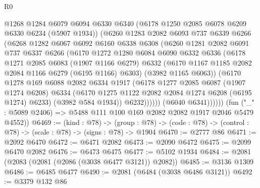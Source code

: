 \begin{lexlean}{R0}
\begin{coremodule}
                  @1268
                  @1284
                  @6079
                  @6094
                  @6330
                  @6340
                  (@6178 @1250 @2085 @6078 @6209 @6330 @6234 (@5907 @1934))
                  (@6260
                    @1283
                    @2082
                    @6093
                    @737
                    @6339
                    @6266
                    (@6268
                      @1282
                      @6067
                      @6092
                      @6160
                      @6338
                      @6308
                      (@6260
                        @1281
                        @2082
                        @6091
                        @737
                        @6337
                        @6266
                        (@6170
                          @1272
                          @1280
                          @6084
                          @6090
                          @6332
                          @6336
                          (@6178
                            @1271
                            @2085
                            @6083
                            (@1907 @1166 @6279)
                            @6332
                            (@6170 @1167 @1185 @2082 @2084 @1166 @6279 (@6195 @1166) @6303)
                            (@3982 @1165 @6063))
                          (@6170
                            @1278
                            @169
                            @6088
                            @2082
                            @6334
                            @1917
                            (@6178
                              @1277
                              @2085
                              @6087
                              (@1907 @1274 @6208)
                              @6334
                              (@6170 @1275 @1122 @2082 @2084 @1274 @6208 (@6195 @1274) @6233)
                              (@3982 @584 @1934))
                            @6232))))))
                (@6040 @6341))))))
      (fun ("_" : @5089 @2406) => @5488 @111 @100 @169 @2082 @2082 @1917 @2046 @5479 @4552))
@6469 := (kind : @78) ->
  (group : @78) -> (code : @78) -> (control : @78) -> (scale : @78) -> (signs : @78) -> @1904
@6470 := @2777 @86
@6471 := @2092 @6470
@6472 := @6471 @2082
@6473 := @2090 @6472
@6475 := @2099 @6470 @2082
@6476 := @6473 @6475
@6477 := @5102 @1934
@6484 := @2081 (@2083 (@2081 (@2086 (@3038 @6477 @3121)) @2082))
@6485 := @3136 @1309
@6486 := @6485 @6477
@6490 := @2081 (@6484 (@3038 @6486 @3121))
@6492 := @3379 @132 @86

\end{coremodule}
\end{lexlean}
